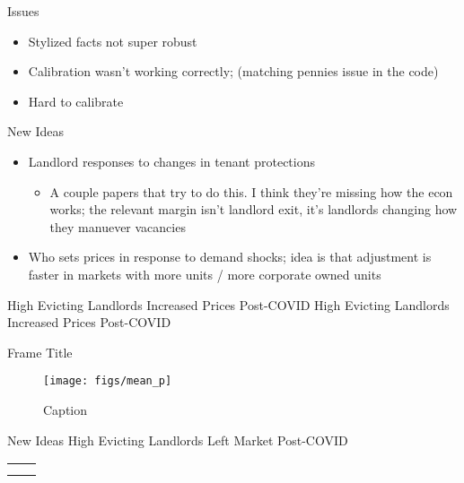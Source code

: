 \documentclass[10pt, xcolor=dvipsnames]{beamer}
\begin{document}
\begin{frame}{Issues}
    \begin{itemize}
        \item Stylized facts not super robust
        \item Calibration wasn't working correctly; (matching pennies issue in the code)
        \item Hard to calibrate
    \end{itemize}
    
\end{frame}

\begin{frame}{New Ideas}
    \begin{itemize}
        \item Landlord responses to changes in tenant protections
        \begin{itemize}
            \item A couple papers that try to do this. I think they're missing how the econ works; the relevant margin isn't landlord exit, it's landlords changing how they manuever vacancies
        \end{itemize}
        \item Who sets prices in response to demand shocks; idea is that adjustment is faster in markets with more units / more corporate owned units
    \end{itemize}
    
\end{frame}

\begin{frame}{High Evicting Landlords Increased Prices Post-COVID}
    High Evicting Landlords Increased Prices Post-COVID
    \tiny
    
    
\end{frame}

\begin{frame}{Frame Title}
    \begin{figure}
        \centering
        \texttt{[image: figs/mean\_p]}
        \caption{Caption}
        \label{fig:placeholder}
    \end{figure}
\end{frame}

\begin{frame}{New Ideas}
    High Evicting Landlords Left Market Post-COVID
    \tiny
    \begin{table}[]
        \centering
        \begin{tabular}{c|c}
             &  \\
             & 
        \end{tabular}
        
        \label{tab:placeholder}
    \end{table}
    
\end{frame}
\end{document}
